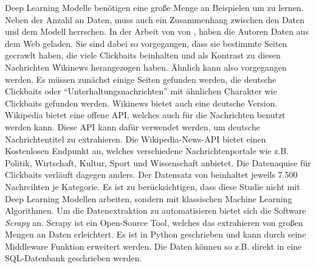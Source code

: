 Deep Learning Modelle benötigen eine große Menge an Beispielen um zu lernen. Neben der Anzahl an Daten, muss auch ein Zusammenhang zwischen den Daten und dem Modell herrschen. In der Arbeit von von \cite*{Chakrabortya}, haben die Autoren Daten aus dem Web geladen. Sie sind dabei so vorgegangen, dass sie bestimmte Seiten gecrawlt haben, die viele Clickbaits beinhalten und als Kontrast zu diesen Nachrichten Wikinews herangezogen haben. Ähnlich kann also vorgegangen werden. Es müssen zunächst einige Seiten gefunden werden, die deutsche Clickbaits oder \enquote{Unterhaltungsnachrichten} mit ähnlichen Charakter wie Clickbaits gefunden werden. Wikinews bietet auch eine deutsche Version. Wikipedia bietet eine offene API, welches auch für die Nachrichten benutzt werden kann. Diese API kann dafür verwendet werden, um deutsche Nachrichtentitel zu extrahieren. Die Wikipedia-News-API bietet einen Kostenlosen Endpunkt an, welches verschiedene Nachrichtenportale wie z.B. Politik, Wirtschaft, Kultur, Sport und Wissenschaft anbietet.  Die Datenaquise für Clickbaits verläuft dagegen anders. Der Datensatz von \cite*{Chakrabortya} beinhaltet jeweils 7.500 Nachrcihten je Kategorie. Es ist zu berücksichtigen, dass diese Studie nicht mit Deep Learning Modellen arbeiten, sondern mit klassischen Machine Learning Algorithmen. Um die Datenextraktion zu automatisieren bietet sich die Software \textit{Scrapy} an. Scrapy ist ein Open-Source Tool, welches das extrahieren von großen Mengen an Daten erleichtert. Es ist in Python geschrieben und kann durch seine Middleware Funktion erweitert werden. Die Daten können so z.B. direkt in eine SQL-Datenbank geschrieben werden.


